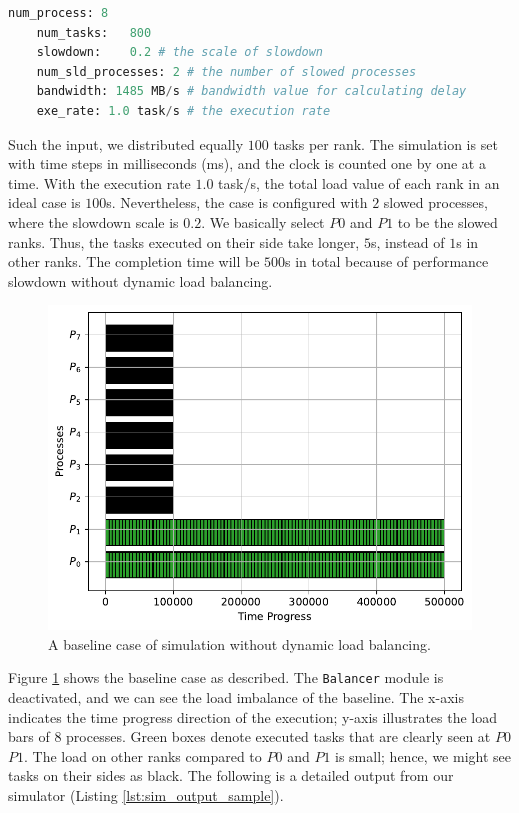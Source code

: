 \begin{lstlisting}[language=Python, caption={An input sample for simulator}, label={lst:sim_input_sample}]
	num_process: 8
	num_tasks:   800
	slowdown:    0.2 # the scale of slowdown
	num_sld_processes: 2 # the number of slowed processes
	bandwidth: 1485 MB/s # bandwidth value for calculating delay
	exe_rate: 1.0 task/s # the execution rate
\end{lstlisting}
\hfill

Such the input, we distributed equally $100$ tasks per rank. The simulation is set with time steps in milliseconds (ms), and the clock is counted one by one at a time. With the execution rate $1.0$ task/s, the total load value of each rank in an ideal case is $100$s. Nevertheless, the case is configured with $2$ slowed processes, where the slowdown scale is $0.2$. We basically select $P0$ and $P1$ to be the slowed ranks. Thus, the tasks executed on their side take longer, $5$s, instead of $1$s in other ranks. The completion time will be $500$s in total because of performance slowdown without dynamic load balancing.\\

\begin{figure}[t]
  \centering
  \includegraphics[scale=0.65]{./pictures/poc_implementation/poc_visualize_baseline_case_8_processes.pdf}
	\caption{A baseline case of simulation without dynamic load balancing.}
	\label{fig:simulator_baseline_case}
\end{figure}

Figure \ref{fig:simulator_baseline_case} shows the baseline case as described. The \texttt{Balancer} module is deactivated, and we can see the load imbalance of the baseline. The x-axis indicates the time progress direction of the execution; y-axis illustrates the load bars of $8$ processes. Green boxes denote executed tasks that are clearly seen at $P0$ $P1$. The load on other ranks compared to $P0$ and $P1$ is small; hence, we might see tasks on their sides as black. The following is a detailed output from our simulator (Listing \ref{lst:sim_output_sample}).

